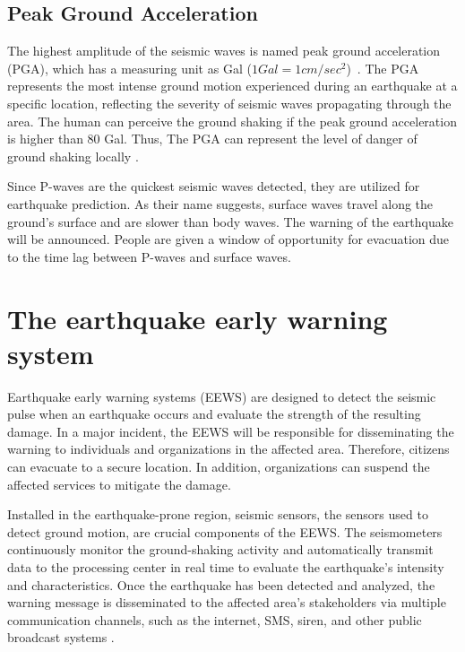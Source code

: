 \subsection{Peak Ground Acceleration}
The highest amplitude of the seismic waves is named peak ground acceleration (PGA), which has a measuring unit as Gal ($1Gal = 1cm/sec^2$)~\cite{chiang2022neural}. The PGA represents the most intense ground motion experienced during an earthquake at a specific location, reflecting the severity of seismic waves propagating through the area. The human can perceive the ground shaking if the peak ground acceleration is higher than 80 Gal. Thus, The PGA can represent the level of danger of ground shaking locally \cite{chiang2022neural}.

Since P-waves are the quickest seismic waves detected, they are utilized for earthquake prediction. As their name suggests, surface waves travel along the ground's surface and are slower than body waves\cite{mousavi2020machine}. The warning of the earthquake will be announced. People are given a window of opportunity for evacuation due to the time lag between P-waves and surface waves. 

\section{The earthquake early warning system} \label{sec:EEWS}

Earthquake early warning systems (EEWS) are designed to detect the seismic pulse when an earthquake occurs and evaluate the strength of the resulting damage\cite{chiang2022neural, jozinovic2020rapid, li2018machine}. In a major incident, the EEWS will be responsible for disseminating the warning to individuals and organizations in the affected area. Therefore, citizens can evacuate to a secure location. In addition, organizations can suspend the affected services to mitigate the damage\cite{gasparini2007earthquake}. 

Installed in the earthquake-prone region, seismic sensors, the sensors used to detect ground motion, are crucial components of the EEWS. The seismometers continuously monitor the ground-shaking activity and automatically transmit data to the processing center in real time to evaluate the earthquake's intensity and characteristics. Once the earthquake has been detected and analyzed, the warning message is disseminated to the affected area's stakeholders via multiple communication channels, such as the internet, SMS, siren, and other public broadcast systems \cite{gasparini2007earthquake, allen2019earthquake}. 

